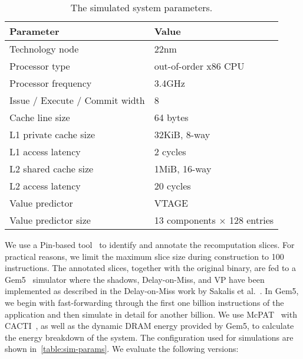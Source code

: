 
\begin{table}
  \centering
  \caption{The simulated system parameters.}
  \label{table:sim-params}
  \begin{tabular}{ l | l }
    \hline
    Parameter & Value\\
    \hline
    Technology node                           & 22nm \\
    Processor type                            & out-of-order x86 CPU \\
    Processor frequency                       & 3.4GHz \\
    Issue / Execute / Commit width            & 8 \\
    Cache line size                           & 64 bytes \\
    L1 private cache size                     & 32KiB, 8-way \\
    L1 access latency                         & 2 cycles \\
    L2 shared cache size                      & 1MiB, 16-way \\
    L2 access latency                         & 20 cycles \\
    Value predictor                           & VTAGE \\
    Value predictor size                      & 13 components $\times$ 128 entries \\
    \hline
  \end{tabular}
\end{table}

We use a Pin-based tool~\cite{pin} to identify and annotate the recomputation slices. For practical reasons, we limit the maximum slice size during construction to 100 instructions.
The annotated slices, together with the original binary, are fed to a Gem5~\cite{binkert_gem5:CANEWS2011} simulator where the shadows, Delay-on-Miss, and VP have been implemented as described in the Delay-on-Miss work by Sakalis et al.~\cite{sakalis+:ISCA2019vp}. 
In Gem5, we begin with fast-forwarding through the first one billion instructions of the application and then simulate in detail for another billion. 
We use McPAT~\cite{li_mcpat:MICRO2009} with CACTI~\cite{li_CACTI:ICCAD2011}, as well as the dynamic DRAM energy provided by Gem5, to calculate the energy breakdown of the system. 
The configuration used for simulations are shown in~\autoref{table:sim-params}.
We evaluate the following versions:

